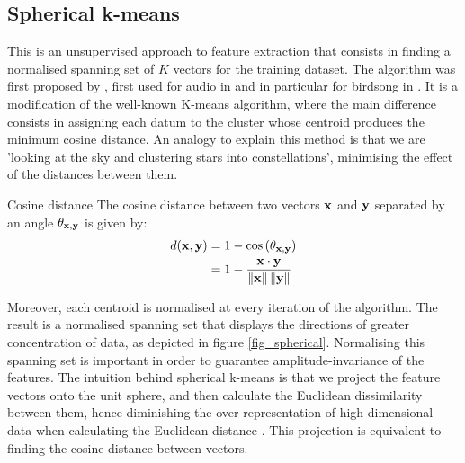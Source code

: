 \documentclass[../main.tex]{subfiles} \label{chapter_soa}
\begin{document}
\subsection{Spherical k-means} \label{subsection_spherical}
This is an unsupervised approach to feature extraction that consists in finding a normalised spanning set of $K$ vectors for the training dataset. The algorithm was first proposed by \cite{Coates2012}, first used for audio in \cite{Dieleman2013} and in particular for birdsong in \cite{Stowell2014}. It is a modification of the well-known K-means algorithm, where the main difference consists in assigning each datum to the cluster whose centroid produces the minimum cosine distance. An analogy to explain this method is that we are 'looking at the sky and clustering stars into constellations', minimising the effect of the distances between them.
\begin{definition}{Cosine distance} \label{def_cosine_distance}
The cosine distance between two vectors $\mathbf{x}$ and $\mathbf{y}$ separated by an angle $\theta_{\mathbf{x}, \mathbf{y}}$ is given by:
\begin{align*}
d(\mathbf{x}, \mathbf{y}) &= 1 - \cos{(\theta_{\mathbf{x}, \mathbf{y}})}\\
&= 1 - \frac{\mathbf{x} \cdot \mathbf{y}}{\left\lVert\mathbf{x}\right\rVert\left\lVert\mathbf{y}\right\rVert}
\end{align*}
\end{definition}
\par Moreover, each centroid is normalised at every iteration of the algorithm. The result is a normalised spanning set that displays the directions of greater concentration of data, as depicted in figure \ref{fig_spherical}. Normalising this spanning set is important in order to guarantee amplitude-invariance of the features. The intuition behind spherical k-means is that we project the feature vectors onto the unit sphere, and then calculate the Euclidean dissimilarity between them, hence diminishing the over-representation of high-dimensional data when calculating the Euclidean distance \cite{Hornik2012}. This projection is equivalent to finding the cosine distance between vectors. 
\end{document}
